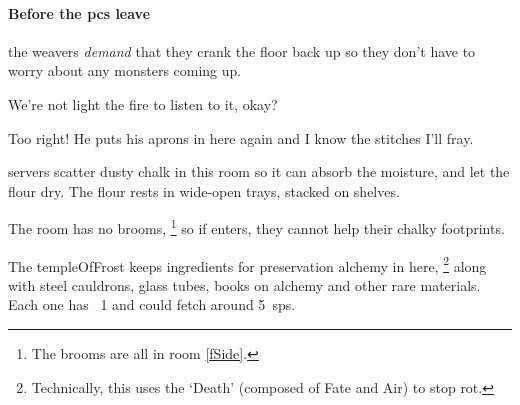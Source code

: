 \begin{multicols}{2}
\paragraph{Before the \glspl{pc} leave}
the \glspl{weaver} \emph{demand} that they crank the floor back up so they don't have to worry about any \glspl{monster} coming up.

\begin{speechtext}
  We're not light the fire to listen to it, okay?

  \vspace{-.4em}

  \vspace{-.4em}

  \vspace{-.3em}


  Too right!
  He puts his aprons in here again and I know the stitches I'll fray.

  \vspace{-.3em}

  \vspace{-.3em}

\end{speechtext}


\Glspl{server} scatter dusty chalk in this room so it can absorb the moisture, and let the flour dry.
The flour rests in wide-open trays, stacked on shelves.

The room has no brooms,%
\footnote{The brooms are all in room \vref{fSide}.}
so if  enters, they cannot help their chalky footprints.


The \gls{templeOfFrost} keeps \glspl{ingredient} for preservation \gls{alchemy} in here,
\footnote{Technically, this uses the `Death'  (composed of Fate and Air) to stop rot.}
along with steel cauldrons, glass tubes, books on \gls{alchemy} and other rare materials.
Each one has ~1 and could fetch around 5~\glspl{sp}.


\end{multicols}

